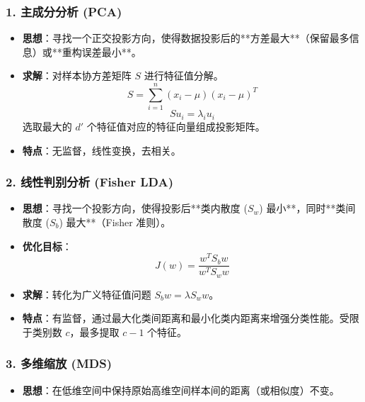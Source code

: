 \documentclass[a4paper, 11pt]{ctexart}
\begin{document}
\subsubsection{1. 主成分分析 (PCA)}
\begin{itemize}
    \item \textbf{思想}：寻找一个正交投影方向，使得数据投影后的**方差最大**（保留最多信息）或**重构误差最小**。
    \item \textbf{求解}：对样本协方差矩阵 $S$ 进行特征值分解。
    \begin{equation}
        S = \sum_{i=1}^n (x_i - \mu)(x_i - \mu)^T
    \end{equation}
    \begin{equation}
        S u_i = \lambda_i u_i
    \end{equation}
    选取最大的 $d'$ 个特征值对应的特征向量组成投影矩阵。
    \item \textbf{特点}：无监督，线性变换，去相关。
\end{itemize}

\subsubsection{2. 线性判别分析 (Fisher LDA)}
\begin{itemize}
    \item \textbf{思想}：寻找一个投影方向，使得投影后**类内散度 ($S_w$) 最小**，同时**类间散度 ($S_b$) 最大**（Fisher 准则）。
    \item \textbf{优化目标}：
    \begin{equation}
        J(w) = \frac{w^T S_b w}{w^T S_w w}
    \end{equation}
    \item \textbf{求解}：转化为广义特征值问题 $S_b w = \lambda S_w w$。
    \item \textbf{特点}：有监督，通过最大化类间距离和最小化类内距离来增强分类性能。受限于类别数 $c$，最多提取 $c-1$ 个特征。
\end{itemize}

\subsubsection{3. 多维缩放 (MDS)}
\begin{itemize}
    \item \textbf{思想}：在低维空间中保持原始高维空间样本间的距离（或相似度）不变。
\end{itemize}
\end{document}

